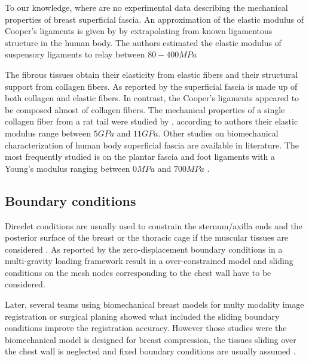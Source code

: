  To our knowledge, where are no experimental data describing the mechanical properties of breast superficial fascia. An approximation of the elastic modulus of Cooper's ligaments is given by \cite{gefen_mechanics_2007} by extrapolating from known ligamentous structure in the human body. The authors estimated the elastic modulus of suspensory ligaments to relay between $80 - 400 MPa$
 
 The fibrous tissues obtain their elasticity from elastic fibers and their structural support from collagen fibers. As reported by \cite{riggio_anatomical_2000} the superficial fascia is made up of both collagen and elastic fibers. In contrast, the Cooper's ligaments appeared to be composed almost of collagen fibers.  The mechanical properties of a single collagen fiber from a rat tail were studied by \cite{wenger_mechanical_2007}, according to authors their elastic modulus range between $5 GPa$ and $11 GPa$. Other studies on biomechanical characterization of human body superficial fascia are available in literature. The most frequently studied is on the plantar fascia and foot ligaments with a Young's modulus ranging between $0 MPa$ and $700 MPa$ \citep{cheung_effects_2004,kongsgaard_mechanical_2011}. 

\subsection{Boundary conditions}

Direclet conditions are usually used to constrain the sternum/axilla ends and the posterior surface of the breast or the thoracic cage if the muscular tissues are considered \citep{griesenauer_breast_2017,rajagopal_creating_2008,pathmanathan_predicting_2008, gamage_modelling_2012,griesenauer_breast_2017}. As reported by \cite{carter_biomechanical_2009} the zero-displacement boundary conditions in a multi-gravity loading framework result in a over-constrained model and sliding conditions on the mesh nodes corresponding to the chest wall have to be considered.    

  Later, several teams using biomechanical breast models for multy modality image registration or surgical planing showed what included the sliding boundary conditions  \citep{georgii_simulation_2016,han_nonlinear_2014}  improve the registration accuracy. However those studies were the biomechanical model is designed for breast compression, the tissues sliding over the chest wall is neglected and fixed boundary conditions are usually assumed \citep{sturgeon_finite_element_2016, martinez_finite_2017}.
  
